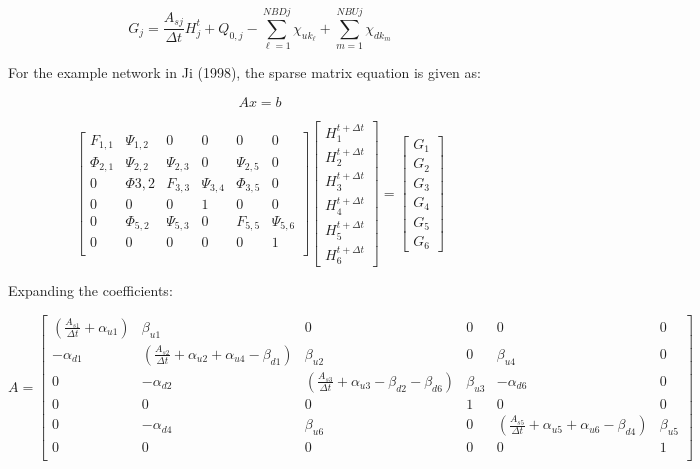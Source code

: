 \documentclass[11pt]{article}
\begin{document}
\begin{equation}
  \boxed{
  G_j = \frac{A_{sj}}{\Delta t} H_j^t + Q_{0,j} - \sum_{\ell=1}^{NBDj} \chi_{uk_\ell} + \sum_{m=1}^{NBUj} \chi_{dk_m}
  }
\end{equation}

For the example network in Ji (1998), the sparse matrix equation is given as:

\begin{equation}
  A x = b
\end{equation}

\begin{equation}
  \begin{bmatrix}
   F_{1,1} & \Psi_{1,2} & 0 & 0 & 0 & 0 \\
   \Phi_{2,1} & \Psi_{2,2} & \Psi_{2,3} & 0 & \Psi_{2,5} & 0 \\
   0 & \Phi{3,2} & F_{3,3} & \Psi_{3,4} & \Phi_{3,5} & 0 \\
   0 & 0 & 0 & 1 & 0 & 0 \\
   0 & \Phi_{5,2} & \Psi_{5,3} & 0 & F_{5,5} & \Psi_{5,6} \\
   0 & 0 & 0 & 0 & 0 & 1 \\
  \end{bmatrix}
  \begin{bmatrix}
    H_{1}^{t + \Delta t} \\ H_{2}^{t + \Delta t} \\ H_{3}^{t + \Delta t} \\ H_{4}^{t + \Delta t} \\
    H_{5}^{t + \Delta t} \\ H_{6}^{t + \Delta t}
  \end{bmatrix}
  =
  \begin{bmatrix}
   G_1 \\ G_2 \\ G_3 \\ G_4 \\ G_5 \\ G_6 
  \end{bmatrix}
\end{equation}

Expanding the coefficients:

\begin{equation}
  A = 
  \begin{bmatrix}
   ( \frac{A_{s1}}{\Delta t} + \alpha_{u1} ) & \beta_{u1} & 0 & 0 & 0 & 0 \\ 
   - \alpha_{d1} & ( \frac{A_{s2}}{\Delta t} + \alpha_{u2} + \alpha_{u4} - \beta_{d1} ) & \beta_{u2} & 0 & \beta_{u4} & 0 \\
   0 & - \alpha_{d2} & ( \frac{A_{s3}}{\Delta t} + \alpha_{u3} - \beta_{d2} - \beta_{d6} ) & \beta_{u3} & - \alpha_{d6} & 0 \\
   0 & 0 & 0 & 1 & 0 & 0 \\
   0 & - \alpha_{d4} & \beta_{u6} & 0 & ( \frac{A_{s5}}{\Delta t} + \alpha_{u5} + \alpha_{u6} - \beta_{d4} ) & \beta_{u5} \\
   0 & 0 & 0 & 0 & 0 & 1 \\
  \end{bmatrix}
\end{equation}
\end{document}
